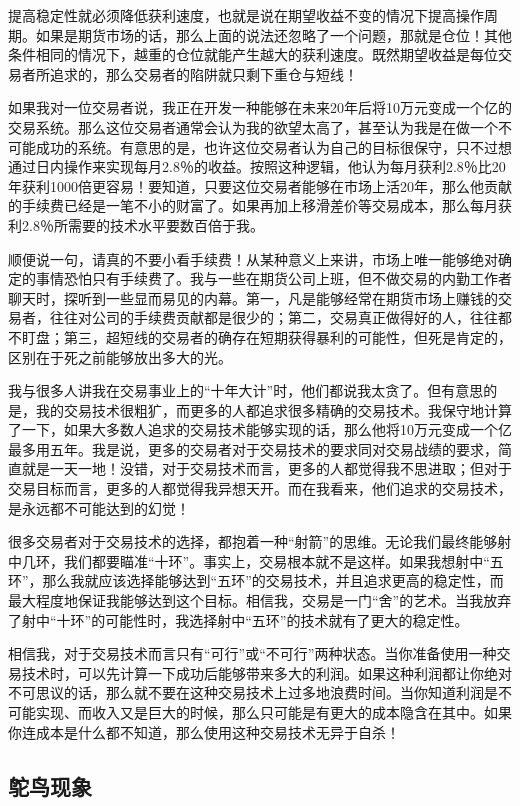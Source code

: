 提高稳定性就必须降低获利速度，也就是说在期望收益不变的情况下提高操作周期。如果是期货市场的话，那么上面的说法还忽略了一个问题，那就是仓位！其他条件相同的情况下，越重的仓位就能产生越大的获利速度。既然期望收益是每位交易者所追求的，那么交易者的陷阱就只剩下重仓与短线！

如果我对一位交易者说，我正在开发一种能够在未来20年后将10万元变成一个亿的交易系统。那么这位交易者通常会认为我的欲望太高了，甚至认为我是在做一个不可能成功的系统。有意思的是，也许这位交易者认为自己的目标很保守，只不过想通过日内操作来实现每月2.8％的收益。按照这种逻辑，他认为每月获利2.8％比20年获利1000倍更容易！要知道，只要这位交易者能够在市场上活20年，那么他贡献的手续费已经是一笔不小的财富了。如果再加上移滑差价等交易成本，那么每月获利2.8％所需要的技术水平要数百倍于我。

顺便说一句，请真的不要小看手续费！从某种意义上来讲，市场上唯一能够绝对确定的事情恐怕只有手续费了。我与一些在期货公司上班，但不做交易的内勤工作者聊天时，探听到一些显而易见的内幕。第一，凡是能够经常在期货市场上赚钱的交易者，往往对公司的手续费贡献都是很少的；第二，交易真正做得好的人，往往都不盯盘；第三，超短线的交易者的确存在短期获得暴利的可能性，但死是肯定的，区别在于死之前能够放出多大的光。

我与很多人讲我在交易事业上的“十年大计”时，他们都说我太贪了。但有意思的是，我的交易技术很粗犷，而更多的人都追求很多精确的交易技术。我保守地计算了一下，如果大多数人追求的交易技术能够实现的话，那么他将10万元变成一个亿最多用五年。我是说，更多的交易者对于交易技术的要求同对交易战绩的要求，简直就是一天一地！没错，对于交易技术而言，更多的人都觉得我不思进取；但对于交易目标而言，更多的人都觉得我异想天开。而在我看来，他们追求的交易技术，是永远都不可能达到的幻觉！

很多交易者对于交易技术的选择，都抱着一种“射箭”的思维。无论我们最终能够射中几环，我们都要瞄准“十环”。事实上，交易根本就不是这样。如果我想射中“五环”，那么我就应该选择能够达到“五环”的交易技术，并且追求更高的稳定性，而最大程度地保证我能够达到这个目标。相信我，交易是一门“舍”的艺术。当我放弃了射中“十环”的可能性时，我选择射中“五环”的技术就有了更大的稳定性。

相信我，对于交易技术而言只有“可行”或“不可行”两种状态。当你准备使用一种交易技术时，可以先计算一下成功后能够带来多大的利润。如果这种利润都让你绝对不可思议的话，那么就不要在这种交易技术上过多地浪费时间。当你知道利润是不可能实现、而收入又是巨大的时候，那么只可能是有更大的成本隐含在其中。如果你连成本是什么都不知道，那么使用这种交易技术无异于自杀！

\subsection{鸵鸟现象}

